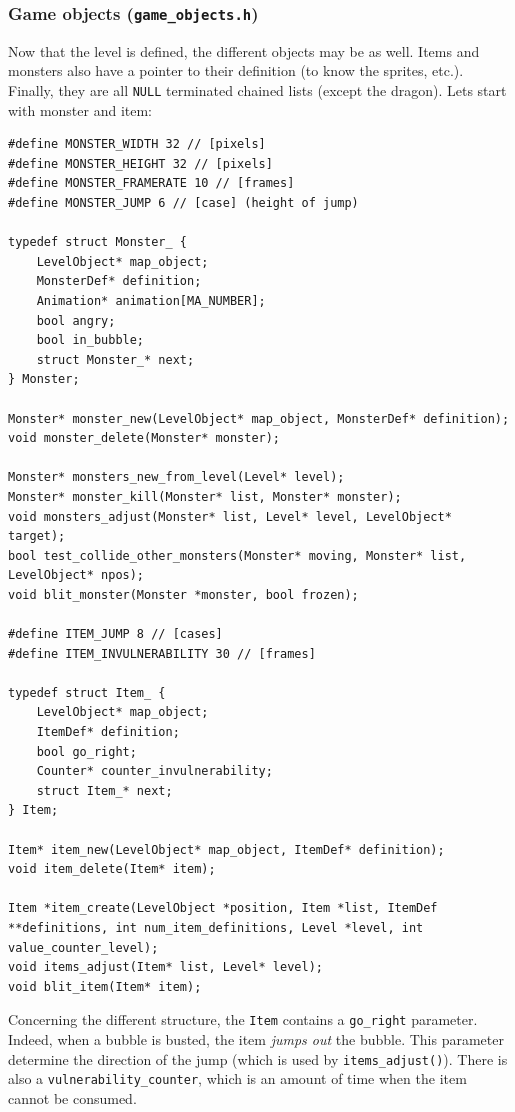 \documentclass[12pt,a4paper]{article}
\newcommand{\cc}[1]{\texttt{#1}}
\begin{document}
\subsubsection{Game objects (\texttt{game\_objects.h})}

Now that the level is defined, the different objects may be as well. Items and monsters also have a pointer to their definition (to know the sprites, etc.). Finally, they are all \cc{NULL} terminated chained lists (except the dragon). Lets start with monster and item:

\begin{verbatim}
#define MONSTER_WIDTH 32 // [pixels]
#define MONSTER_HEIGHT 32 // [pixels]
#define MONSTER_FRAMERATE 10 // [frames]
#define MONSTER_JUMP 6 // [case] (height of jump)

typedef struct Monster_ {
    LevelObject* map_object;
    MonsterDef* definition;
    Animation* animation[MA_NUMBER];
    bool angry;
    bool in_bubble;
    struct Monster_* next;
} Monster;

Monster* monster_new(LevelObject* map_object, MonsterDef* definition);
void monster_delete(Monster* monster);

Monster* monsters_new_from_level(Level* level);
Monster* monster_kill(Monster* list, Monster* monster);
void monsters_adjust(Monster* list, Level* level, LevelObject* target);
bool test_collide_other_monsters(Monster* moving, Monster* list, LevelObject* npos);
void blit_monster(Monster *monster, bool frozen);

#define ITEM_JUMP 8 // [cases]
#define ITEM_INVULNERABILITY 30 // [frames]

typedef struct Item_ {
    LevelObject* map_object;
    ItemDef* definition;
    bool go_right;
    Counter* counter_invulnerability;
    struct Item_* next;
} Item;

Item* item_new(LevelObject* map_object, ItemDef* definition);
void item_delete(Item* item);

Item *item_create(LevelObject *position, Item *list, ItemDef **definitions, int num_item_definitions, Level *level, int value_counter_level);
void items_adjust(Item* list, Level* level);
void blit_item(Item* item);
\end{verbatim}

Concerning the different structure, the \cc{Item} contains a \cc{go_right} parameter. Indeed, when a bubble is busted, the item \textit{jumps out} the bubble. This parameter determine the direction of the jump (which is used by \cc{items_adjust()}). There is also a \cc{vulnerability_counter}, which is an amount of time when the item cannot be consumed.
\end{document}
